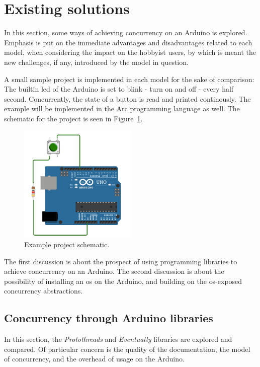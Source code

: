 \section{Existing solutions}\label{sec:existingsolutions}
In this section, some ways of achieving concurrency on an Arduino is explored. Emphasis is put on the immediate advantages and disadvantages related to each model, when considering the impact on the hobbyist users, by which is meant the new challenges, if any, introduced by the model in question.

A small sample project is implemented in each model for the sake of comparison: The builtin \gls{led} of the Arduino is set to blink - turn on and off - every half second. Concurrently, the state of a button is read and printed continously. The example will be implemented in the Arc programming language as well. The schematic for the project is seen in Figure~\ref{fig:exampleprojectschematic}.


\begin{figure}[htb!]
  \centering
  \includegraphics[width=0.5\textwidth]{figures/Example_Project}
  \caption{Example project schematic.}
  \label{fig:exampleprojectschematic}
\end{figure}


The first discussion is about the prospect of using programming libraries to achieve concurrency on an Arduino. The second discussion is about the possibility of installing an \gls{os} on the Arduino, and building on the \gls{os}-exposed concurrency abstractions.

\subsection{Concurrency through Arduino libraries}\label{subsec:arduinolibraries}
In this section, the \textit{Protothreads} and \textit{Eventually} libraries are explored and compared. Of particular concern is the quality of the documentation, the model of concurrency, and the overhead of usage on the Arduino.

